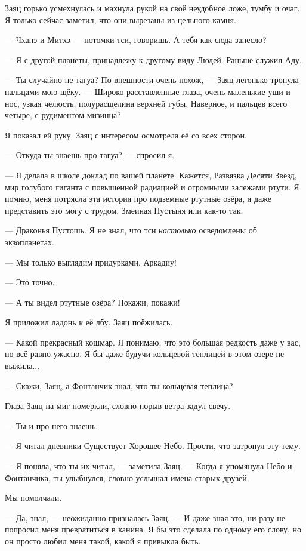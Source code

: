 Заяц горько усмехнулась и махнула рукой на своё неудобное ложе, тумбу и очаг.
Я только сейчас заметил, что они вырезаны из цельного камня.

--- Чханэ и Митхэ --- потомки тси, говоришь.
А тебя как сюда занесло?

--- Я с другой планеты, принадлежу к другому виду Людей.
Раньше служил Аду.

--- Ты случайно не тагуа?
По внешности очень похож, --- Заяц легонько тронула пальцами мою щёку.
--- Широко расставленные глаза, очень маленькие уши и нос, узкая челюсть, полурасщелина верхней губы.
Наверное, и пальцев всего четыре, с рудиментом мизинца?

Я показал ей руку.
Заяц с интересом осмотрела её со всех сторон.

--- Откуда ты знаешь про тагуа? --- спросил я.

--- Я делала в школе доклад по вашей планете.
Кажется, Развязка Десяти Звёзд, мир голубого гиганта с повышенной радиацией и огромными залежами ртути.
Я помню, меня потрясла эта история про подземные ртутные озёра, я даже представить это могу с трудом.
Змеиная Пустыня или как-то так.

--- Драконья Пустошь.
Я не знал, что тси \emph{настолько} осведомлены об экзопланетах.

--- Мы только выглядим придурками, Аркадиу!

--- Это точно.

--- А ты видел ртутные озёра?
Покажи, покажи!

Я приложил ладонь к её лбу.
Заяц поёжилась.

--- Какой прекрасный кошмар.
Я понимаю, что это большая редкость даже у вас, но всё равно ужасно.
Я бы даже будучи кольцевой теплицей в этом озере не выжила...

--- Скажи, Заяц, а Фонтанчик знал, что ты кольцевая теплица?

Глаза Заяц на миг померкли, словно порыв ветра задул свечу.

--- Ты и про него знаешь.

--- Я читал дневники Существует-Хорошее-Небо.
Прости, что затронул эту тему.

--- Я поняла, что ты их читал, --- заметила Заяц.
--- Когда я упомянула Небо и Фонтанчика, ты улыбнулся, словно услышал имена старых друзей.

Мы помолчали.

--- Да, знал, --- неожиданно призналась Заяц.
--- И даже зная это, ни разу не попросил меня превратиться в канина.
Я бы это сделала по одному его слову, но он просто любил меня такой, какой я привыкла быть.

